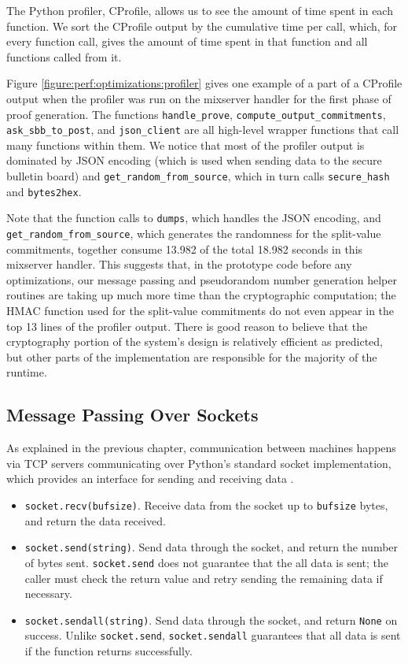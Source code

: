The Python profiler, CProfile, allows us to see the amount of time spent in each function. We sort the CProfile output by the cumulative time per call, which, for every function call, gives the amount of time spent in that function and all functions called from it.

Figure \ref{figure:perf:optimizations:profiler} gives one example of a part of a CProfile output when the profiler was run on the mixserver handler for the first phase of proof generation. The functions \texttt{handle\_prove}, \texttt{compute\_output\_commitments}, \texttt{ask\_sbb\_to\_post}, and \texttt{json\_client} are all high-level wrapper functions that call many functions within them. We notice that most of the profiler output is dominated by JSON encoding (which is used when sending data to the secure bulletin board) and \texttt{get\_random\_from\_source}, which in turn calls \texttt{secure\_hash} and \texttt{bytes2hex}.

Note that the function calls to \texttt{dumps}, which handles the JSON encoding, and \\
\texttt{get\_random\_from\_source}, which generates the randomness for the split-value commitments, together consume 13.982 of the total 18.982 seconds in this mixserver handler. This suggests that, in the prototype code before any optimizations, our message passing and pseudorandom number generation helper routines are taking up much more time than the cryptographic computation; the HMAC function used for the split-value commitments do not even appear in the top 13 lines of the profiler output. There is good reason to believe that the cryptography portion of the system's design is relatively efficient as predicted, but other parts of the implementation are responsible for the majority of the runtime.

\subsection{Message Passing Over Sockets} \label{perf:optimizations:sockets}

As explained in the previous chapter, communication between machines happens via TCP servers communicating over Python's standard socket implementation, which provides an interface for sending and receiving data \cite{python-sockets}.
\begin{itemize}
\item \texttt{socket.recv(bufsize)}. Receive data from the socket up to \texttt{bufsize} bytes, and return the data received.
\item \texttt{socket.send(string)}. Send data through the socket, and return the number of bytes sent. \texttt{socket.send} does not guarantee that the all data is sent; the caller must check the return value and retry sending the remaining data if necessary.
\item \texttt{socket.sendall(string)}. Send data through the socket, and return \texttt{None} on success. Unlike \texttt{socket.send}, \texttt{socket.sendall} guarantees that all data is sent if the function returns successfully.
\end{itemize}

